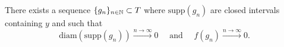 \begin{lemma}\label{lemma:gn}
        There exists a sequence $\{g_n\}_{n \in {\mathbb N}} \subset T$ where  $\mathrm{supp}(g_n)$ are closed intervals containing $y$ and such that 
        \[\mathrm{diam}(\mathrm{supp}(g_n)) \xrightarrow{n \to \infty} 0 \quad \text{ and } \quad f(g_n) \xrightarrow{n \to \infty} 0.\]
\end{lemma}
